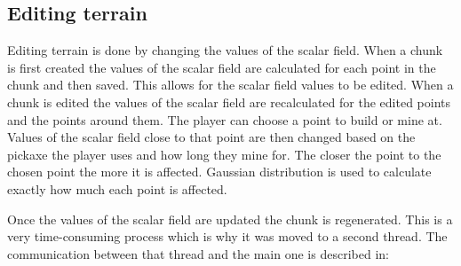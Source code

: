 \subsection{Editing terrain} \label{sec:terrain_editing}
Editing terrain is done by changing the values of the scalar field.
When a chunk is first created the values of the scalar field are calculated for each point in the chunk and then saved.
This allows for the scalar field values to be edited.
When a chunk is edited the values of the scalar field are recalculated for the edited points and the points around them.
The player can choose a point to build or mine at.
Values of the scalar field close to that point are then changed based on the pickaxe the player uses and how long they mine for.
The closer the point to the chosen point the more it is affected.
Gaussian distribution is used to calculate exactly how much each point is affected.

Once the values of the scalar field are updated the chunk is regenerated.
This is a very time-consuming process which is why it was moved to a second thread.
The communication between that thread and the main one is described in: 